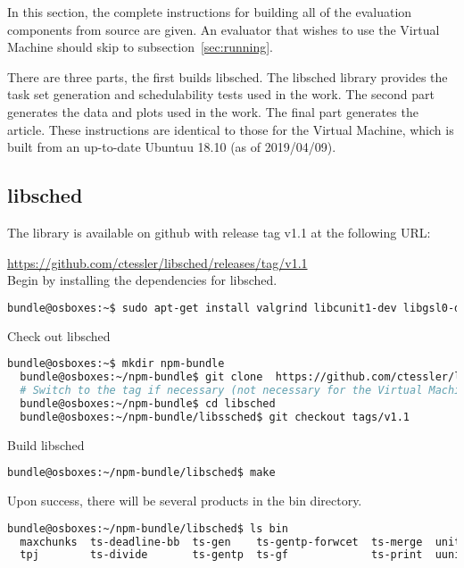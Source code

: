 \documentclass[a4paper]{article}
\begin{document}
In this section, the complete instructions for building all of the
evaluation components from source are given. An evaluator that wishes
to use the Virtual Machine should skip to subsection~\ref{sec:running}.

There are three parts, the first builds libsched. The
libsched library provides the task set generation and schedulability
tests used in the work. The second part generates the data and plots
used in the work. The final part generates the article. These
instructions are identical to those for the Virtual Machine, which is
built from an up-to-date Ubuntuu 18.10 (as of 2019/04/09).

\subsection{libsched}

The library is available on github with release tag v1.1 at the
following URL:

\href{https://github.com/ctessler/libsched/releases/tag/v1.1}{https://github.com/ctessler/libsched/releases/tag/v1.1} \\

{\noindent}Begin by installing the dependencies for libsched.

\begin{lstlisting}[language=bash]
  bundle@osboxes:~$ sudo apt-get install valgrind libcunit1-dev libgsl0-dev
\end{lstlisting}

{\noindent}Check out libsched
\begin{lstlisting}[language=bash]
  bundle@osboxes:~$ mkdir npm-bundle
  bundle@osboxes:~/npm-bundle$ git clone  https://github.com/ctessler/libsched.git
  # Switch to the tag if necessary (not necessary for the Virtual Machine)
  bundle@osboxes:~/npm-bundle$ cd libsched
  bundle@osboxes:~/npm-bundle/libssched$ git checkout tags/v1.1
\end{lstlisting}

{\noindent}Build libsched
\begin{lstlisting}[language=bash]
  bundle@osboxes:~/npm-bundle/libsched$ make
\end{lstlisting}

{\noindent}Upon success, there will be several products in the bin directory.
\begin{lstlisting}[language=bash]
  bundle@osboxes:~/npm-bundle/libsched$ ls bin
  maxchunks  ts-deadline-bb  ts-gen    ts-gentp-forwcet  ts-merge  unittest
  tpj        ts-divide       ts-gentp  ts-gf             ts-print  uunifast
\end{lstlisting}
\end{document}
